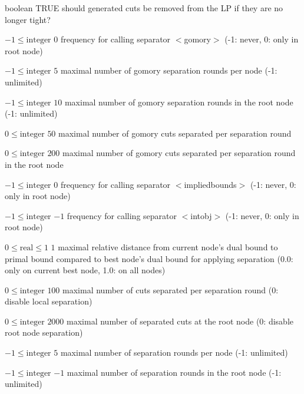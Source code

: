%
{boolean}%
{TRUE}%
{should generated cuts be removed from the LP if they are no longer tight?}%
{}

%
{$-1\leq\textrm{integer}$}%
{$0$}%
{frequency for calling separator $<$gomory$>$ (-1: never, 0: only in root node)}%
{}

%
{$-1\leq\textrm{integer}$}%
{$5$}%
{maximal number of gomory separation rounds per node (-1: unlimited)}%
{}

%
{$-1\leq\textrm{integer}$}%
{$10$}%
{maximal number of gomory separation rounds in the root node (-1: unlimited)}%
{}

%
{$0\leq\textrm{integer}$}%
{$50$}%
{maximal number of gomory cuts separated per separation round}%
{}

%
{$0\leq\textrm{integer}$}%
{$200$}%
{maximal number of gomory cuts separated per separation round in the root node}%
{}

%
{$-1\leq\textrm{integer}$}%
{$0$}%
{frequency for calling separator $<$impliedbounds$>$ (-1: never, 0: only in root node)}%
{}

%
{$-1\leq\textrm{integer}$}%
{$-1$}%
{frequency for calling separator $<$intobj$>$ (-1: never, 0: only in root node)}%
{}

%
{$0\leq\textrm{real}\leq1$}%
{$1$}%
{maximal relative distance from current node's dual bound to primal bound compared to best node's dual bound for applying separation (0.0: only on current best node, 1.0: on all nodes)}%
{}

%
{$0\leq\textrm{integer}$}%
{$100$}%
{maximal number of cuts separated per separation round (0: disable local separation)}%
{}

%
{$0\leq\textrm{integer}$}%
{$2000$}%
{maximal number of separated cuts at the root node (0: disable root node separation)}%
{}

%
{$-1\leq\textrm{integer}$}%
{$5$}%
{maximal number of separation rounds per node (-1: unlimited)}%
{}

%
{$-1\leq\textrm{integer}$}%
{$-1$}%
{maximal number of separation rounds in the root node (-1: unlimited)}%
{}

